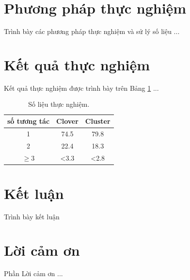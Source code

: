 \documentclass[12pt, a4paper]{article}
\begin{document}
\section{Phương pháp thực nghiệm}
Trình bày các phương pháp thực nghiệm và sử lý số liệu ...


\section{Kết quả thực nghiệm}
Kết quả thực nghiệm được trình bày trên Bảng \ref{tab:solieu} ...
 
\begin{table}[!htb]
\centering
	\caption{Số liệu thực nghiệm.}
	\label{tab:solieu} 
	\begin{tabular}{ccc}
		\hline
		số tương tác	& Clover 	& Cluster\\
		\hline
		1	& 74.5 & 79.8\\
		2	& 22.4 & 18.3\\
		$\ge$3	& <3.3 & <2.8\\
		\hline
	\end{tabular}
\end{table}


\section{Kết luận}
Trình bày kết luận
\section{Lời cảm ơn}
Phần Lời cảm ơn ...



\end{document}
